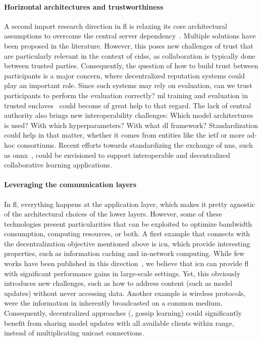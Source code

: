 \paragraph{Horizontal architectures and trustworthiness}


A second import research direction in \gls{fl} is relaxing its core architectural assumptions to overcome the central server dependency~\cite{kairouz_AdvancesOpenProblems_2021}.
Multiple solutions have been proposed in the literature.
However, this poses new challenges of trust that are particularly relevant in the context of \glspl{cids}, as collaboration is typically done between trusted parties.
Consequently, the question of how to build trust between participants is a major concern, where decentralized reputation systems could play an important role.
Since such systems may rely on evaluation, can we trust participants to perform the evaluation correctly?
\Gls{ml} training and evaluation in trusted enclaves~\cite{mondal_FlateeFederatedLearning_2021} could become of great help to that regard.
The lack of central authority also brings new interoperability challenges: Which model architectures is used? With which hyperparameters? With what \gls{dl} framework?
Standardization could help in that matter, whether it comes from entities like the \gls{ietf} or more ad-hoc consortiums.
Recent efforts towards standardizing the exchange of \glspl{nn}, such as \gls{onnx}~\cite{ONNX}, could be envisioned to support interoperable and decentralized collaborative learning applications.


\paragraph{Leveraging the communication layers}

In \gls{fl}, everything happens at the application layer, which makes it pretty agnostic of the architectural choices of the lower layers.
However, some of these technologies present particularities that can be exploited to optimize bandwidth consumption, computing resources, or both.
A first example that connects with the decentralization objective mentioned above is \gls{icn}, which provide interesting properties, such as information caching and in-network computing.
While few works have been published in this direction~\cite{bano_KafkaFedTwoTierFederated_2022,amadeo_ClientDiscoveryData_2022}, we believe that \gls{icn} can provide \gls{fl} with significant performance gains in large-scale settings.
Yet, this obviously introduces new challenges, such as how to address content (such as model updates) without never accessing data.
Another example is wireless protocols, were the information in inherently broadcasted on a common medium.
Consequently, decentralized approaches (\eg, gossip learning) could significantly benefit from sharing model updates with all available clients within range, instead of multiplicating unicast connections.


